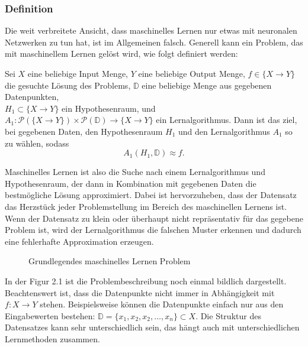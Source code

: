 \documentclass[12pt,letterpaper,ngerman]{article}
\begin{document}
\subsubsection{Definition}
Die weit verbreitete Ansicht, dass maschinelles Lernen nur etwas mit neuronalen 
Netzwerken zu tun hat, ist im Allgemeinen falsch. Generell kann ein Problem, 
das mit maschinellem Lernen gelöst wird, wie folgt definiert werden:
\begin{definition}
  Sei $X$ eine beliebige Input Menge, $Y$ eine beliebige Output Menge,
  $f \in \{X \to Y\}$ die gesuchte Lösung des Problems, 
  $\mathbb{D}$ eine beliebige Menge aus gegebenen Datenpunkten,\\
  $H_1 \subset \{X \to Y\}$ ein Hypothesenraum, und 
  $A_1: \mathcal{P}(\{X \to Y\}) \times 
  \mathcal{P}(\mathbb{D}) \to \{ X \to Y \} $
  ein Lernalgorithmus. Dann ist das ziel, bei gegebenen Daten,
  den Hypothesenraum $H_1$ und den Lernalgorithmus $A_1$ so zu wählen,
  sodass
  \[
    A_1(H_1, \mathbb{D}) \approx f.
  \]
\end{definition}
Maschinelles Lernen ist also die Suche nach einem Lernalgorithmus und 
Hypothesenraum, der dann in Kombination mit gegebenen Daten die bestmögliche
Lösung approximiert. Dabei ist hervorzuheben, dass der Datensatz das Herzstück
jeder Problemstellung im Bereich des maschinellen Lernens ist. Wenn der
Datensatz zu klein oder überhaupt nicht repräsentativ für das gegebene Problem 
ist, wird der Lernalgorithmus die falschen Muster erkennen und dadurch eine 
fehlerhafte Approximation erzeugen.
\begin{figure}[H]
  \begin{center}
    \caption{Grundlegendes maschinelles Lernen Problem}
  \end{center}
\end{figure}
\pagebreak
In der Figur 2.1 ist die Problembeschreibung noch einmal bildlich dargestellt.
Beachtenswert ist, dass die Datenpunkte nicht immer in Abhängigkeit mit 
$f: X \to Y$ stehen. Beispielsweise können die Datenpunkte einfach nur aus den
Eingabewerten bestehen: $\mathbb{D} = \{x_1,x_2,x_2, \dots, x_n\} \subset X$.
Die Struktur des Datensatzes kann sehr unterschiedlich sein, das hängt auch mit 
unterschiedlichen Lernmethoden zusammen.
\end{document}
